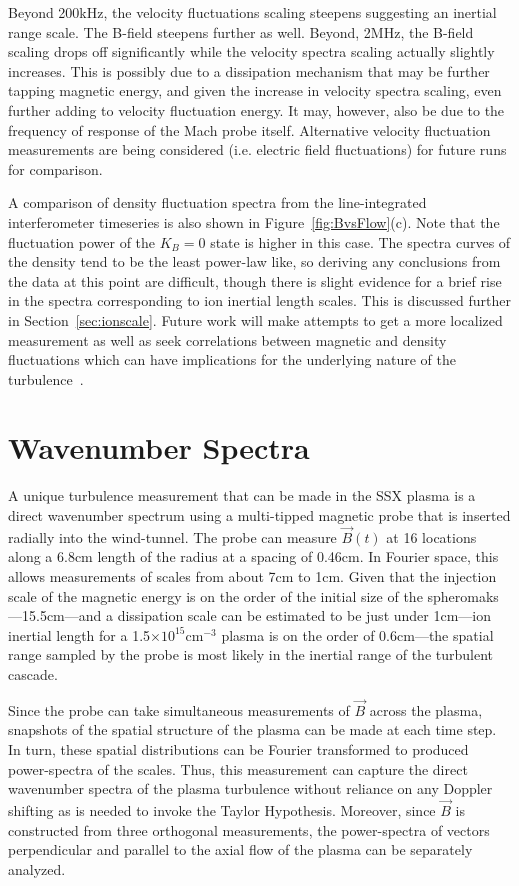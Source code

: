 \documentclass[aip,prl,amsmath,amssymb,reprint,superscriptaddress]{revtex4-1} %
\begin{document}
Beyond 200kHz, the velocity fluctuations scaling steepens suggesting an inertial range scale. The B-field steepens further as well. Beyond, 2MHz, the B-field scaling drops off significantly while the velocity spectra scaling actually slightly increases. This is possibly due to a dissipation mechanism that may be further tapping magnetic energy, and given the increase in velocity spectra scaling, even further adding to velocity fluctuation energy. It may, however, also be due to the frequency of response of the Mach probe itself. Alternative velocity fluctuation measurements are being considered (i.e. electric field fluctuations) for future runs for comparison.

A comparison of density fluctuation spectra from the line-integrated interferometer timeseries is also shown in Figure~\ref{fig:BvsFlow}(c). Note that the fluctuation power of the $K_{B}=0$ state is higher in this case. The spectra curves of the density tend to be the least power-law like, so deriving any conclusions from the data at this point are difficult, though there is slight evidence for a brief rise in the spectra corresponding to ion inertial length scales. This is discussed further in Section~\ref{sec:ionscale}. Future work will make attempts to get a more localized measurement as well as seek correlations between magnetic and density fluctuations which can have implications for the underlying nature of the turbulence~\cite{klein12}.

\section{Wavenumber Spectra}\label{sec:wavenumber}

A unique turbulence measurement that can be made in the SSX plasma is a direct wavenumber spectrum using a multi-tipped magnetic probe that is inserted radially into the wind-tunnel. The probe can measure $\vec{B}(t)$ at 16 locations along a 6.8cm length of the radius at a spacing of 0.46cm. In Fourier space, this allows measurements of scales from about 7cm to 1cm. Given that the injection scale of the magnetic energy is on the order of the initial size of the spheromaks---15.5cm---and a dissipation scale can be estimated to be just under 1cm---ion inertial length for a 1.5$\times 10^{15}$cm$^{-3}$ plasma is on the order of 0.6cm---the spatial range sampled by the probe is most likely in the inertial range of the turbulent cascade.

Since the probe can take simultaneous measurements of $\vec{B}$ across the plasma, snapshots of the spatial structure of the plasma can be made at each time step. In turn, these spatial distributions can be Fourier transformed to produced power-spectra of the scales. Thus, this measurement can capture the direct wavenumber spectra of the plasma turbulence without reliance on any Doppler shifting as is needed to invoke the Taylor Hypothesis. Moreover, since $\vec{B}$ is constructed from three orthogonal measurements, the power-spectra of vectors perpendicular and parallel to the axial flow of the plasma can be separately analyzed. 
\end{document}
